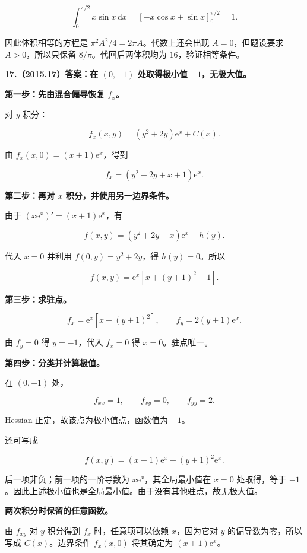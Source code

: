 \documentclass[UTF8,11pt,fontset=windows]{ctexart}
\begin{document}
$$
\int_0^{\pi/2}x\sin x\,\mathrm dx
=\left[-x\cos x+\sin x\right]_0^{\pi/2}=1.
$$

因此体积相等的方程是 $\pi^2A^2/4=2\pi A$。代数上还会出现 $A=0$，但题设要求 $A>0$，所以只保留 $8/\pi$。代回后两体积均为 $16$，验证相等条件。

\clearpage

\textbf{17.（2015.17）答案：在 $(0,-1)$ 处取得极小值 $-1$，无极大值。}

\textbf{第一步：先由混合偏导恢复 $f_x$。}

对 $y$ 积分：

$$
f_x(x,y)=(y^2+2y)\mathrm e^x+C(x).
$$

由 $f_x(x,0)=(x+1)\mathrm e^x$，得到

$$
f_x=(y^2+2y+x+1)\mathrm e^x.
$$

\textbf{第二步：再对 $x$ 积分，并使用另一边界条件。}

由于 $(x\mathrm e^x)'=(x+1)\mathrm e^x$，有

$$
f(x,y)=(y^2+2y+x)\mathrm e^x+h(y).
$$

代入 $x=0$ 并利用 $f(0,y)=y^2+2y$，得 $h(y)=0$。所以

$$
f(x,y)=\mathrm e^x[x+(y+1)^2-1].
$$

\textbf{第三步：求驻点。}

$$
f_x=\mathrm e^x[x+(y+1)^2],
\qquad f_y=2(y+1)\mathrm e^x.
$$

由 $f_y=0$ 得 $y=-1$，代入 $f_x=0$ 得 $x=0$。驻点唯一。

\textbf{第四步：分类并计算极值。}

在 $(0,-1)$ 处，

$$
f_{xx}=1,\qquad f_{xy}=0,\qquad f_{yy}=2.
$$

Hessian 正定，故该点为极小值点，函数值为 $-1$。

还可写成

$$
f(x,y)=(x-1)\mathrm e^x+(y+1)^2\mathrm e^x.
$$

后一项非负；前一项的一阶导数为 $x\mathrm e^x$，其全局最小值在 $x=0$ 处取得，等于 $-1$。因此上述极小值也是全局最小值。由于没有其他驻点，故无极大值。

\textbf{两次积分时保留的任意函数。}

由 $f_{xy}$ 对 $y$ 积分得到 $f_x$ 时，任意项可以依赖 $x$，因为它对 $y$ 的偏导数为零，所以写成 $C(x)$。边界条件 $f_x(x,0)$ 将其确定为 $(x+1)\mathrm e^x$。
\end{document}
